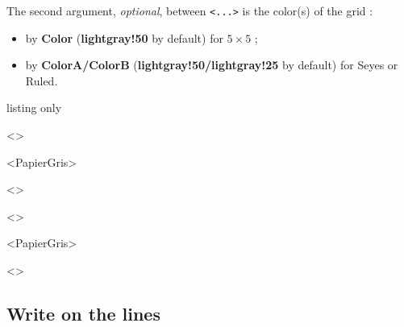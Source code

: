 \documentclass[a4paper]{article}
\newcommand\Cle[1]{{\bfseries\sffamily\textlangle #1\textrangle}}
\begin{document}
The second argument, \textit{optional}, between \texttt{<...>} is the color(s) of the grid :

\begin{itemize}
	\item by \Cle{Color} (\Cle{lightgray!50} by default) for $5\times5$  ;
	\item by \Cle{ColorA/ColorB} (\Cle{lightgray!50/lightgray!25} by default) for Seyes or Ruled.
\end{itemize}

\medskip

\begin{PresentationCode}{listing only}
\begin{EnvGrid}[NumSquares=18x4,Grid=Seyes,Margin=3]<\ColSeyes>
\end{EnvGrid}

\begin{EnvGrid}[NumSquares=36x8,Enlarge=3/3]<PapierGris>
\end{EnvGrid}

\begin{center}
	\begin{EnvGrid}[NumSquares=12x3,Grid=Ruled,Margin=2]<\ColRuled>
	\end{EnvGrid}
\end{center}
\end{PresentationCode}

\medskip

\begin{EnvGrid}[NumSquares=18x4,Grid=Seyes,Margin=3]<\ColSeyes>
\end{EnvGrid}

\smallskip

\begin{EnvGrid}[NumSquares=36x8,Enlarge=3/3]<PapierGris>
\end{EnvGrid}

\smallskip

\begin{center}
	\begin{EnvGrid}[NumSquares=12x3,Grid=Ruled,Margin=2]<\ColRuled>
	\end{EnvGrid}
\end{center}

\pagebreak

\subsection{Write on the lines}
\end{document}
